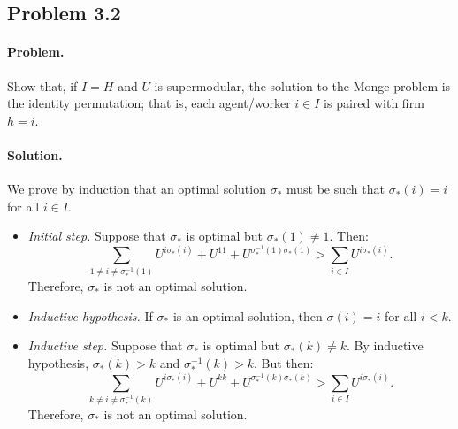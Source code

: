 \subsection{Problem 3.2}
\paragraph{Problem.} Show that, if $I = H$ and $U$ is supermodular, the solution to the Monge problem is the identity permutation; that is, each agent/worker $i \in I$ is paired with firm $h = i$.

\paragraph{Solution.}
We prove by induction that an optimal solution $\sigma_*$ must be such that $\sigma_*(i) = i$ for all $i \in I$.
\begin{itemize}
\item \textit{Initial step.} Suppose that $\sigma_*$ is optimal but $\sigma_*(1) \neq 1$. Then:
\[
\sum_{1 \neq i \neq \sigma_*^{-1}(1)} U^{i \sigma_*(i)} + U^{11} + U^{\sigma_*^{-1}(1) \sigma_*(1)} > \sum_{i \in I} U^{i \sigma_*(i)}.
\]
Therefore, $\sigma_*$ is not an optimal solution.
\item \textit{Inductive hypothesis.} If $\sigma_*$ is an optimal solution, then $\sigma(i) = i$ for all $i < k$.
\item \textit{Inductive step.} Suppose that $\sigma_*$ is optimal but $\sigma_*(k) \neq k$. By inductive hypothesis, $\sigma_*(k) > k$ and $\sigma_*^{-1}(k) > k$. But then:
\[
\sum_{k \neq i \neq \sigma_*^{-1}(k)} U^{i \sigma_*(i)} + U^{kk} + U^{\sigma_*^{-1}(k) \sigma_*(k)} > \sum_{i \in I} U^{i \sigma_*(i)}.
\]
Therefore, $\sigma_*$ is not an optimal solution.
\end{itemize}